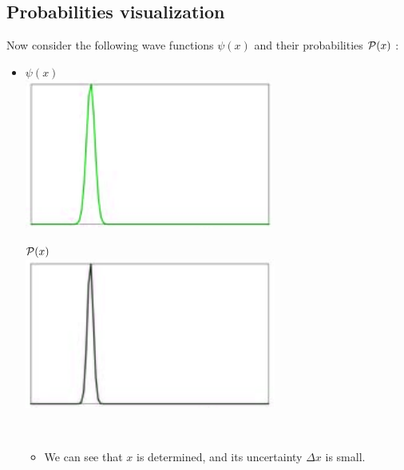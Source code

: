 \documentclass[12pt,oneside]{book}
\begin{document}
\subsection{Probabilities visualization}
Now consider the following wave functions $\psi(x)$ and their probabilities $\mathcal{P}(x)$ :
\begin{itemize}
	\item \begin{minipage}{0.3\linewidth}
		      $\psi(x)$\\
		      \includegraphics[width=\linewidth]{../pic/3302/6.png}\\
	      \end{minipage}
	      \begin{minipage}{0.3\linewidth}
		      $\mathcal{P}(x)$\\
		      \includegraphics[width=\linewidth]{../pic/3302/7.png}
	      \end{minipage} \\
	      \begin{itemize}
		      \item  We can see that $x$ is determined, and its uncertainty $\Delta x $ is small.

\end{itemize}
\end{itemize}
\end{document}

